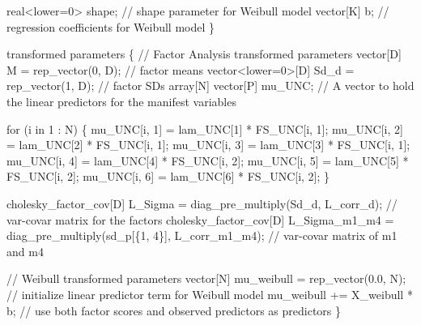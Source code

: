 \documentclass[
  letterpaper,
  DIV=11,
  numbers=noendperiod]{scrreprt}
\newenvironment{Shaded}{\begin{snugshade}}{\end{snugshade}}
\newcommand{\CommentTok}[1]{\textcolor[rgb]{0.37,0.37,0.37}{#1}}
\newcommand{\ControlFlowTok}[1]{\textcolor[rgb]{0.00,0.23,0.31}{#1}}
\newcommand{\DataTypeTok}[1]{\textcolor[rgb]{0.68,0.00,0.00}{#1}}
\newcommand{\DecValTok}[1]{\textcolor[rgb]{0.68,0.00,0.00}{#1}}
\newcommand{\FloatTok}[1]{\textcolor[rgb]{0.68,0.00,0.00}{#1}}
\newcommand{\KeywordTok}[1]{\textcolor[rgb]{0.00,0.23,0.31}{#1}}
\newcommand{\NormalTok}[1]{\textcolor[rgb]{0.00,0.23,0.31}{#1}}
\begin{document}
\begin{Shaded}
\begin{Highlighting}[]
  \DataTypeTok{real}\NormalTok{\textless{}}\KeywordTok{lower}\NormalTok{=}\DecValTok{0}\NormalTok{\textgreater{} shape; }\CommentTok{// shape parameter for Weibull model}
  \DataTypeTok{vector}\NormalTok{[K] b; }\CommentTok{// regression coefficients for Weibull model}
\NormalTok{\}}

\KeywordTok{transformed parameters}\NormalTok{ \{}
  \CommentTok{// Factor Analysis transformed parameters}
  \DataTypeTok{vector}\NormalTok{[D] M = rep\_vector(}\DecValTok{0}\NormalTok{, D); }\CommentTok{// factor means}
  \DataTypeTok{vector}\NormalTok{\textless{}}\KeywordTok{lower}\NormalTok{=}\DecValTok{0}\NormalTok{\textgreater{}[D] Sd\_d = rep\_vector(}\DecValTok{1}\NormalTok{, D); }\CommentTok{// factor SDs}
  \DataTypeTok{array}\NormalTok{[N] }\DataTypeTok{vector}\NormalTok{[P] mu\_UNC; }\CommentTok{// A vector to hold the linear predictors for the manifest variables}

  \ControlFlowTok{for}\NormalTok{ (i }\ControlFlowTok{in} \DecValTok{1}\NormalTok{ : N) \{}
\NormalTok{    mu\_UNC[i, }\DecValTok{1}\NormalTok{] = lam\_UNC[}\DecValTok{1}\NormalTok{] * FS\_UNC[i, }\DecValTok{1}\NormalTok{];}
\NormalTok{    mu\_UNC[i, }\DecValTok{2}\NormalTok{] = lam\_UNC[}\DecValTok{2}\NormalTok{] * FS\_UNC[i, }\DecValTok{1}\NormalTok{];}
\NormalTok{    mu\_UNC[i, }\DecValTok{3}\NormalTok{] = lam\_UNC[}\DecValTok{3}\NormalTok{] * FS\_UNC[i, }\DecValTok{1}\NormalTok{];}
\NormalTok{    mu\_UNC[i, }\DecValTok{4}\NormalTok{] = lam\_UNC[}\DecValTok{4}\NormalTok{] * FS\_UNC[i, }\DecValTok{2}\NormalTok{];}
\NormalTok{    mu\_UNC[i, }\DecValTok{5}\NormalTok{] = lam\_UNC[}\DecValTok{5}\NormalTok{] * FS\_UNC[i, }\DecValTok{2}\NormalTok{];}
\NormalTok{    mu\_UNC[i, }\DecValTok{6}\NormalTok{] = lam\_UNC[}\DecValTok{6}\NormalTok{] * FS\_UNC[i, }\DecValTok{2}\NormalTok{];}
\NormalTok{  \}}
  
  \DataTypeTok{cholesky\_factor\_cov}\NormalTok{[D] L\_Sigma = diag\_pre\_multiply(Sd\_d, L\_corr\_d); }\CommentTok{// var{-}covar matrix for the factors}
  \DataTypeTok{cholesky\_factor\_cov}\NormalTok{[D] L\_Sigma\_m1\_m4 = diag\_pre\_multiply(sd\_p[\{}\DecValTok{1}\NormalTok{, }\DecValTok{4}\NormalTok{\}], L\_corr\_m1\_m4); }\CommentTok{// var{-}covar matrix of m1 and m4}
  
  \CommentTok{// Weibull transformed parameters}
  \DataTypeTok{vector}\NormalTok{[N] mu\_weibull = rep\_vector(}\FloatTok{0.0}\NormalTok{, N); }\CommentTok{// initialize linear predictor term for Weibull model}
\NormalTok{  mu\_weibull += X\_weibull * b; }\CommentTok{// use both factor scores and observed predictors as predictors}
\NormalTok{\}}


\end{Highlighting}
\end{Shaded}
\end{document}
